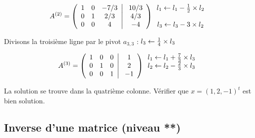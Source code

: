 \documentclass[a4paper, 10pt]{article}
\begin{document}
\begin{equation}
A^{(2)}=
\left(
\begin{array}{c c c c }
1  & 0   & -7/3  \\
0  & 1   & 2/3   \\
0  & 0  &  4  \\ 
\end{array}
\right|
\left.
\begin{array}{c}
{10/3}   \\ {4/3}    \\ -4  \\ 
\end{array}
\right)
\begin{array}{c}
l_1 \leftarrow  l_1 -{1 \over 2}  \times l_2   \\     \\ l_3 \leftarrow  l_3 -3 \times l_2  \\ 
\end{array}
\end{equation}

Divisons la troisième ligne par le pivot $a_{3,3}$ : $l_3 \leftarrow {1 \over 4} \times l_3$

\begin{equation}
A^{(3)}=
\left(
\begin{array}{c c c c }
1  & 0   & 0  \\
0  & 1   & 0   \\
0  & 0  &  1  \\ 
\end{array}
\right|
\left.
\begin{array}{c}
1   \\ 2    \\ -1  \\ 
\end{array}
\right)
\begin{array}{c}
l_1 \leftarrow  l_1 +{7 \over 3}  \times l_3   \\   l_2 \leftarrow  l_2 - {2 \over 3} \times l_3   \\  \\ 
\end{array}
\end{equation}

La solution se trouve dans la quatrième colonne. Vérifier que $x=\left(1, 2, -1 \right)^t$ est bien solution.

\subsection{Inverse d'une matrice (niveau **)}
\end{document}
